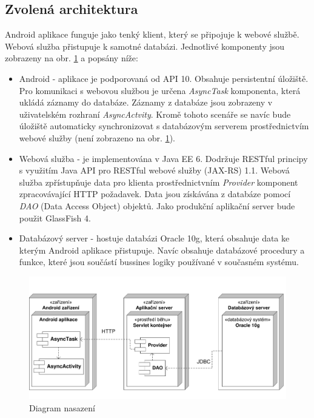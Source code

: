 \documentclass{diplomka}
\begin{document}
\subsection{Zvolená architektura}
Android aplikace funguje jako tenký klient, který se připojuje k webové službě. Webová služba přistupuje k samotné databázi. Jednotlivé komponenty jsou zobrazeny na obr. \ref{fig:deployment} a popsány níže:
\begin{itemize}
\item Android - aplikace je podporovaná od API 10. Obsahuje persistentní úložiště. Pro komunikaci s webovou službou je určena \emph{AsyncTask} komponenta, která ukládá záznamy do databáze. Záznamy z databáze jsou zobrazeny v uživatelském rozhraní \emph{AsyncActvity}. Kromě tohoto scenáře se navíc bude úložiště automaticky synchronizovat s databázovým serverem prostřednictvím webové služby (není zobrazeno na obr. \ref{fig:deployment}).
\item Webová služba - je implementována v Java EE 6. Dodržuje RESTful principy s využitím Java API pro RESTful webové služby (JAX-RS) 1.1. Webová služba zpřístupňuje data pro klienta prostřednictvním \emph{Provider} komponent zpracovávající HTTP požadavek. Data jsou získávána z databáze pomocí \emph{DAO} (Data Access Object) objektů. Jako produkční aplikační server bude použit GlassFish 4.
\item Databázový server - hostuje databázi Oracle 10g, která obsahuje data ke kterým Android aplikace přistupuje. Navíc obsahuje databázové procedury a funkce, které jsou součástí bussines logiky používané v současném systému.
\end{itemize}
\begin{figure}[H]
  \centering
  \includegraphics[scale=0.65]{visio/deployment.pdf}
\caption{Diagram nasazení}
\label{fig:deployment}
\end{figure}
\end{document}

